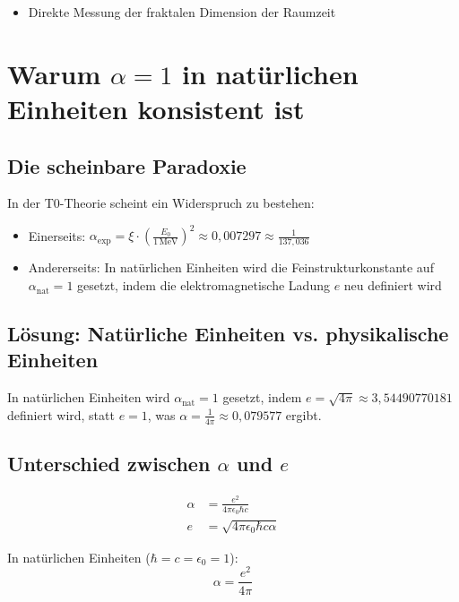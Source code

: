 \documentclass[12pt,a4paper]{article}
\theoremstyle{definition}
\begin{document}
\begin{itemize}
	\item Direkte Messung der fraktalen Dimension der Raumzeit
\end{itemize}
	\section*{Warum \(\alpha = 1\) in natürlichen Einheiten konsistent ist}

\subsection*{Die scheinbare Paradoxie}

In der T0-Theorie scheint ein Widerspruch zu bestehen:
\begin{itemize}
	\item Einerseits: \(\alpha_{\text{exp}} = \xi \cdot \left(\frac{E_0}{1 \, \text{MeV}}\right)^2 \approx 0{,}007297 \approx \frac{1}{137{,}036}\)
	\item Andererseits: In natürlichen Einheiten wird die Feinstrukturkonstante auf \(\alpha_{\text{nat}} = 1\) gesetzt, indem die elektromagnetische Ladung \(e\) neu definiert wird
\end{itemize}

\subsection*{Lösung: Natürliche Einheiten vs. physikalische Einheiten}

\begin{tcolorbox}[colback=green!5!white,colframe=green!75!black]
	In natürlichen Einheiten wird \(\alpha_{\text{nat}} = 1\) gesetzt, indem \(e = \sqrt{4\pi} \approx 3{,}54490770181\) definiert wird, statt \(e = 1\), was \(\alpha = \frac{1}{4\pi} \approx 0{,}079577\) ergibt.
\end{tcolorbox}

\subsection*{Unterschied zwischen \(\alpha\) und \(e\)}

\begin{align*}
	\alpha &= \frac{e^2}{4\pi\epsilon_0\hbar c} \\
	e &= \sqrt{4\pi\epsilon_0\hbar c \alpha}
\end{align*}

In natürlichen Einheiten (\(\hbar = c = \epsilon_0 = 1\)):
\[
\alpha = \frac{e^2}{4\pi}
\]
\end{document}
